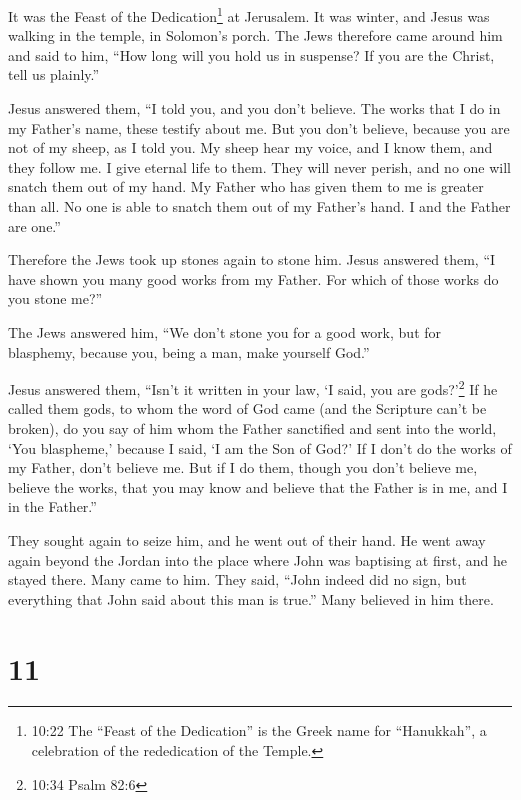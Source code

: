  It was the Feast of the Dedication\footnote{10:22 The
  ``Feast of the Dedication'' is the Greek name for ``Hanukkah'', a
  celebration of the rededication of the Temple.} at Jerusalem.
 It was winter, and Jesus was walking in the temple, in
Solomon's porch.  The Jews therefore came around him and
said to him, ``How long will you hold us in suspense? If you are the
Christ, tell us plainly.''

 Jesus answered them, ``I told you, and you don't believe.
The works that I do in my Father's name, these testify about me.
 But you don't believe, because you are not of my sheep, as
I told you.  My sheep hear my voice, and I know them, and
they follow me.  I give eternal life to them. They will
never perish, and no one will snatch them out of my hand. 
My Father who has given them to me is greater than all. No one is able
to snatch them out of my Father's hand.  I and the Father
are one.''

 Therefore the Jews took up stones again to stone him.
 Jesus answered them, ``I have shown you many good works
from my Father. For which of those works do you stone me?''

 The Jews answered him, ``We don't stone you for a good
work, but for blasphemy, because you, being a man, make yourself God.''

 Jesus answered them, ``Isn't it written in your law, `I
said, you are gods?'\footnote{10:34 Psalm 82:6}  If he
called them gods, to whom the word of God came (and the Scripture can't
be broken),  do you say of him whom the Father sanctified
and sent into the world, `You blaspheme,' because I said, `I am the Son
of God?'  If I don't do the works of my Father, don't
believe me.  But if I do them, though you don't believe me,
believe the works, that you may know and believe that the Father is in
me, and I in the Father.''

 They sought again to seize him, and he went out of their
hand.  He went away again beyond the Jordan into the place
where John was baptising at first, and he stayed there. 
Many came to him. They said, ``John indeed did no sign, but everything
that John said about this man is true.''  Many believed in
him there.

\hypertarget{section-10}{%
\section{11}\label{section-10}}

